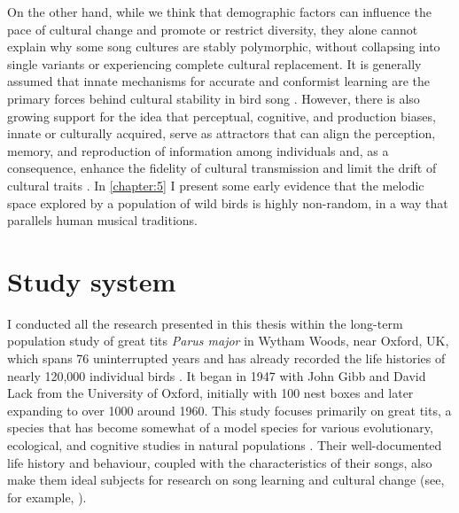 On the other hand, while we think that demographic factors can influence the pace of cultural change and promote or restrict diversity, they alone cannot explain why some song cultures are stably polymorphic, without collapsing into single variants or experiencing complete cultural replacement. It is generally assumed that innate mechanisms for accurate and conformist learning are the primary forces behind cultural stability in bird song \parencite{lachlan2018, lachlan2003a}. However, there is also growing support for the idea that perceptual, cognitive, and production biases, innate or culturally acquired, serve as attractors that can align the perception, memory, and reproduction of information among individuals and, as a consequence, enhance the fidelity of cultural transmission and limit the drift of cultural traits \parencite{feher2009, saldana2019, trehub2015}. In \autoref{chapter:5} I present some early evidence that the melodic space explored by a population of wild birds is highly non-random, in a way that parallels human musical traditions.

\section{Study system}
I conducted all the research presented in this thesis within the long-term population study of great tits \textit{Parus major} in Wytham Woods, near Oxford, UK, which spans 76 uninterrupted years and has already recorded the life histories of nearly 120,000 individual birds \autocite{sheldon2022}. It began in 1947 with John Gibb and David Lack from the University of Oxford, initially with 100 nest boxes and later expanding to over 1000 around 1960. This study focuses primarily on great tits, a species that has become somewhat of a model species for various evolutionary, ecological, and cognitive studies in natural populations \autocite{aplin2017, Boyce1987, charmantier2008, cole2012,firth2018,Firth2016a,spurgin2019}. Their well-documented life history and behaviour, coupled with the characteristics of their songs, also make them ideal subjects for research on song learning and cultural change (see, for example, \cite{lambrechts1990, lind1996, rivera-gutierrez2010a, rivera-gutierrez2010, rivera-gutierrez2011, slagsvold1994, Ritschard2012}). 

